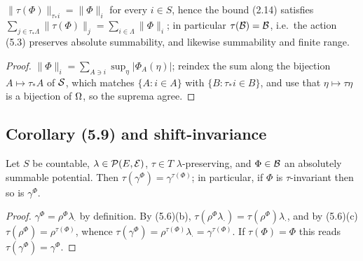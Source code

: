 \begin{lemma}
    \label{lem:trans-norm-map}
    \leanok

    $\|\tau(\Phi)\|_{\tau_* i} = \|\Phi\|_i$ for every $i \in S$, hence the bound (2.14)
    satisfies $\sum_{j \in \tau_*\Lambda}\|\tau(\Phi)\|_j = \sum_{i \in \Lambda}\|\Phi\|_i$; in
    particular $\tau(\mathcal{B}) = \mathcal{B}$, i.e.\ the action (5.3) preserves absolute summability,
    and likewise summability and finite range.
\end{lemma}
\begin{proof}
    \leanok

    $\|\Phi\|_i = \sum_{A \ni i}\sup_\eta |\Phi_A(\eta)|$; reindex the sum along the bijection
    $A \mapsto \tau_* A$ of $\mathcal{S}$, which matches $\{A : i \in A\}$ with
    $\{B : \tau_* i \in B\}$, and use that $\eta \mapsto \tau\eta$ is a bijection of $\Omega$, so
    the suprema agree.
\end{proof}

\subsection*{Corollary (5.9) and shift-invariance}

\begin{corollary}
    \label{cor:trans-gibbs-spec}
    \leanok

    Let $S$ be countable, $\lambda \in \mathcal{P}(E, \mathcal{E})$, $\tau \in T$ $\lambda$-preserving,
    and $\Phi \in \mathcal{B}$ an absolutely summable potential.  Then
    $\tau(\gamma^\Phi) = \gamma^{\tau(\Phi)}$; in particular, if $\Phi$ is $\tau$-invariant then
    so is $\gamma^\Phi$.
\end{corollary}
\begin{proof}
    \leanok

    $\gamma^\Phi = \rho^\Phi \lambda_\cdot$ by definition.  By (5.6)(b),
    $\tau(\rho^\Phi \lambda_\cdot) = \tau(\rho^\Phi)\lambda_\cdot$, and by (5.6)(c)
    $\tau(\rho^\Phi) = \rho^{\tau(\Phi)}$, whence
    $\tau(\gamma^\Phi) = \rho^{\tau(\Phi)}\lambda_\cdot = \gamma^{\tau(\Phi)}$.  If
    $\tau(\Phi) = \Phi$ this reads $\tau(\gamma^\Phi) = \gamma^\Phi$.
\end{proof}

